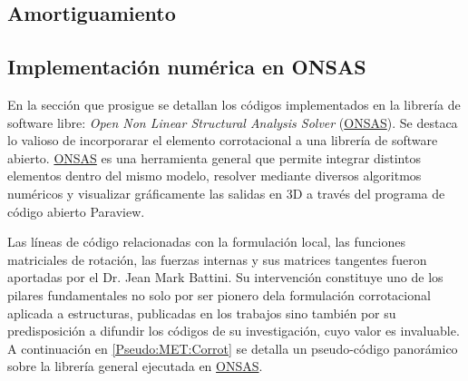 \subsection{Amortiguamiento}
\subsection{Implementación numérica en ONSAS}
En la sección que prosigue se detallan los códigos implementados en la librería de software libre: \emph{Open Non Linear Structural Analysis Solver} (\href{https://github.com/ONSAS/ONSAS/}{ONSAS}). Se destaca lo valioso de incorporarar el elemento corrotacional a una librería de software abierto. \href{https://github.com/ONSAS/ONSAS/}{ONSAS} es una herramienta general que permite integrar distintos elementos dentro del mismo modelo, resolver mediante diversos algoritmos numéricos y visualizar gráficamente las salidas en 3D a través del programa de código abierto Paraview.

Las líneas de código relacionadas con la formulación local, las funciones matriciales de rotación, las fuerzas internas y sus matrices tangentes fueron aportadas por el Dr. Jean Mark Battini. Su intervención constituye uno de los pilares fundamentales no solo por ser pionero dela formulación corrotacional aplicada a estructuras, publicadas en los trabajos \citep{Battini2002} \citep{Le2014} sino también por su predisposición a difundir los códigos de su investigación, cuyo valor es invaluable. A continuación en \ref{Pseudo:MET:Corrot} se detalla un pseudo-código panorámico sobre la librería general ejecutada en \href{https://github.com/ONSAS/ONSAS/}{ONSAS}. 

